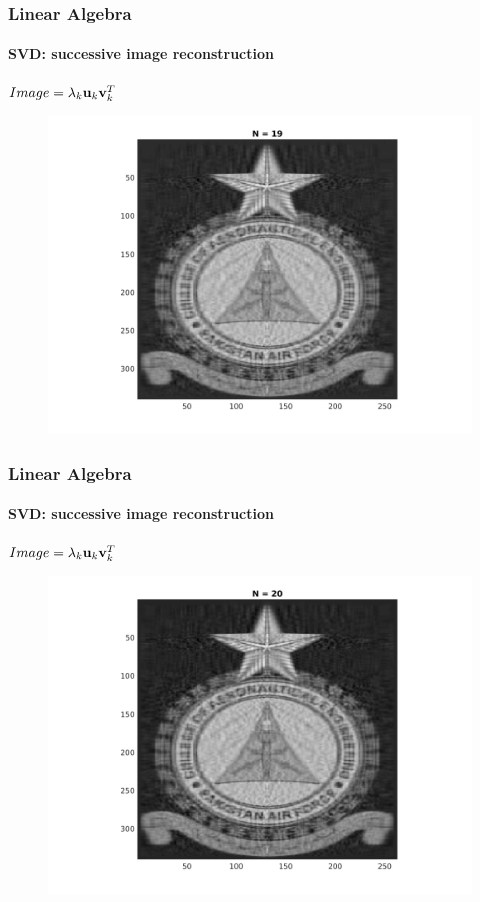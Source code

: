 \documentclass[hyperref={pdfpagelabels=true}]{beamer}
\begin{document}
\begin{frame}
\frametitle{Linear Algebra}
\framesubtitle{SVD: successive image reconstruction} 
\small{
\begin{center}
$Image = \lambda_k{\bf u}_k {\bf v}_k^T$
\end{center}}
\begin{figure}[!htb]
\centering
\includegraphics [scale=0.48]{n/b19.png}
\end{figure}
\end{frame}

\begin{frame}
\frametitle{Linear Algebra}
\framesubtitle{SVD: successive image reconstruction} 
\small{
\begin{center}
$Image = \lambda_k{\bf u}_k {\bf v}_k^T$
\end{center}}
\begin{figure}[!htb]
\centering
\includegraphics [scale=0.48]{n/b20.png}
\end{figure}
\end{frame}
\end{document}
